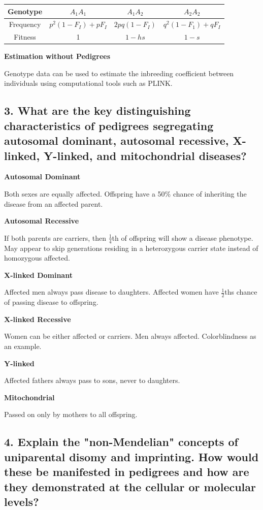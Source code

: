 \documentclass{tufte-handout}
\theoremstyle{noparens}
\begin{document}
\begin{tabular}{c|ccc}
Genotype	& $A_1A_1$ & $A_1A_2$ & $A_2A_2$ \\ 
\hline Frequency	& $p^2(1-F_I) + pF_I$ & $2pq(1-F_I)$ & $q^2(1-F_1) + qF_I$ \\ 
Fitness	& 1 & $1-hs$ & $1-s$ \\ 
\end{tabular} 

\noindent
\textbf{Estimation without Pedigrees}

Genotype data can be used to estimate the inbreeding coefficient between individuals using computational tools such as PLINK.

\newpage
\subsection{3. What are the key distinguishing characteristics of pedigrees segregating autosomal dominant, autosomal recessive, X-linked, Y-linked, and mitochondrial diseases?}
\label{subsec:03}

 \noindent
 \textbf{Autosomal Dominant}
 
 Both sexes are equally affected. Offspring have a 50\% chance of inheriting the disease from an affected parent.
 
 \noindent
 \textbf{Autosomal Recessive}
 
 If both parents are carriers, then $\frac{1}{4}$th of offspring will show a disease phenotype. May appear to skip generations residing in a heterozygous carrier state instead of homozygous affected.
 
 \noindent
 \textbf{X-linked Dominant}
 
Affected men always pass disease to daughters. Affected women have $\frac{1}{2}$ths chance of passing disease to offspring.
 
 \noindent
 \textbf{X-linked Recessive}
 
Women can be either affected or carriers. Men always affected. Colorblindness as an example.
 
\noindent
\textbf{Y-linked}

Affected fathers always pass to sons, never to daughters.

\noindent
\textbf{Mitochondrial}

Passed on only by mothers to all offspring.
 
\newpage
\subsection{4. Explain the "non-Mendelian" concepts of uniparental disomy and imprinting. How would these be manifested in pedigrees and how are they demonstrated at the cellular or molecular levels?}
\label{subsec:04}
\end{document}
